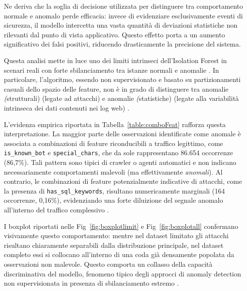 Ne deriva che la soglia di decisione utilizzata per distinguere tra comportamento normale e anomalo perde efficacia: invece di evidenziare esclusivamente eventi di sicurezza, il modello intercetta una vasta quantità di deviazioni statistiche non rilevanti dal punto di vista applicativo. Questo effetto porta a un aumento significativo dei falsi positivi, riducendo drasticamente la precisione del sistema.

Questa analisi mette in luce uno dei limiti intrinseci dell'Isolation Forest in scenari reali con forte sbilanciamento tra istanze normali e anomalie \parencite{liu2008isolation}. In particolare, l’algoritmo, essendo non supervisionato e basato su partizionamenti casuali dello spazio delle feature, non è in grado di distinguere tra anomalie \emph(strutturali) (legate ad attacchi) e anomalie \emph(statistiche) (legate alla variabilità intrinseca dei dati contenuti nei log web) \parencite{liu2012isolationbased}.

L’evidenza empirica riportata in Tabella~\ref{table:comboFeat} rafforza questa interpretazione. La maggior parte delle osservazioni identificate come anomale è associata a combinazioni di feature riconducibili a traffico legittimo, come \texttt{is\_known\_bot} e \texttt{special\_chars}, che da sole rappresentano 86.654 occorrenze (86,7\%). Tali pattern sono tipici di crawler o agenti automatici e non indicano necessariamente comportamenti malevoli (ma effettivamente \emph{anomali}). Al contrario, le combinazioni di feature potenzialmente indicative di attacchi, come la presenza di \texttt{has\_sql\_keywords}, risultano numericamente marginali (164 occorrenze, 0,16\%), evidenziando una forte diluizione del segnale anomalo all’interno del traffico complessivo \parencite{chandola2009anomaly}.

I boxplot riportati nelle Fig~\ref{fig:boxplotlimit} e  Fig~\ref{fig:boxplotall} confermano visivamente questo comportamento: mentre nel dataset limitato gli attacchi risultano chiaramente separabili dalla distribuzione principale, nel dataset completo essi si collocano all’interno di una coda già densamente popolata da osservazioni non malevole. Questo comporta un collasso della capacità discriminativa del modello, fenomeno tipico degli approcci di anomaly detection non supervisionata in presenza di sbilanciamento estremo \parencite{zimek2012survey}.
